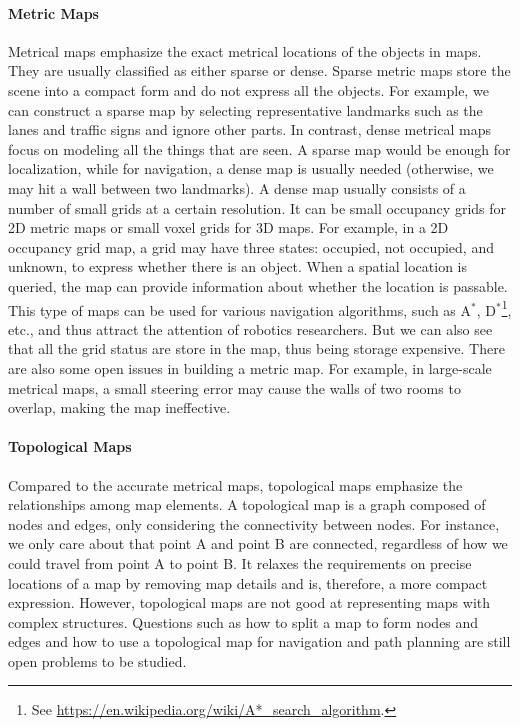 \paragraph{Metric Maps}
Metrical maps emphasize the exact metrical locations of the objects in maps. They are usually classified as either sparse or dense. Sparse metric maps store the scene into a compact form and do not express all the objects. For example, we can construct a sparse map by selecting representative landmarks such as the lanes and traffic signs and ignore other parts. In contrast, dense metrical maps focus on modeling all the things that are seen. A sparse map would be enough for localization, while for navigation, a dense map is usually needed (otherwise, we may hit a wall between two landmarks). A dense map usually consists of a number of small grids at a certain resolution. It can be small occupancy grids for 2D metric maps or small voxel grids for 3D maps. For example, in a 2D occupancy grid map, a grid may have three states: occupied, not occupied, and unknown, to express whether there is an object. When a spatial location is queried, the map can provide information about whether the location is passable. This type of maps can be used for various navigation algorithms, such as A$^*$, D$^*$\footnote{ See \url{https://en.wikipedia.org/wiki/A*_search_algorithm}.}, etc., and thus attract the attention of robotics researchers. But we can also see that all the grid status are store in the map, thus being storage expensive. There are also some open issues in building a metric map. For example, in large-scale metrical maps, a small steering error may cause the walls of two rooms to overlap, making the map ineffective.

\paragraph{Topological Maps}
Compared to the accurate metrical maps, topological maps emphasize the relationships among map elements. A topological map is a graph composed of nodes and edges, only considering the connectivity between nodes. For instance, we only care about that point A and point B are connected, regardless of how we could travel from point A to point B. It relaxes the requirements on precise locations of a map by removing map details and is, therefore, a more compact expression. However, topological maps are not good at representing maps with complex structures. Questions such as how to split a map to form nodes and edges and how to use a topological map for navigation and path planning are still open problems to be studied.

